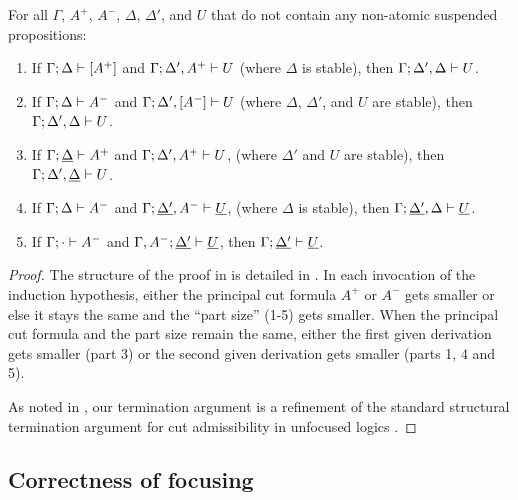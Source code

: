 \bigskip
\begin{theorem}\label{thm:lincut}
For all $\Gamma$, $A^+$, $A^-$, $\Delta$, $\Delta'$, and $U$ that
do not contain any non-atomic suspended propositions:
\begin{enumerate}
\item If ${\Gamma};{\Delta} \vdash {[A^+]} \mathstrut$
      and ${\Gamma};{\Delta',A^+} \vdash {U} \mathstrut$
      (where $\Delta$ is stable), 
      then ${\Gamma};{\Delta',\Delta} \vdash {U} \mathstrut$.
\item If ${\Gamma};{\Delta} \vdash {A^-} \mathstrut$
      and ${\Gamma};{\Delta', [A^-]} \vdash {U} \mathstrut$
      (where $\Delta$, $\Delta'$, and $U$ are stable),
      then ${\Gamma};{\Delta',\Delta} \vdash {U} \mathstrut$. 
\item If ${\Gamma};{\underline{\Delta}} \vdash {A^+} \mathstrut$
      and ${\Gamma};{\Delta', A^+} \vdash {U} \mathstrut$,
      (where $\Delta'$ and $U$ are stable),
      then ${\Gamma};{\Delta',\underline{\Delta}} \vdash {U} \mathstrut$. 
\item If ${\Gamma};{\Delta} \vdash {A^-} \mathstrut$
      and ${\Gamma};{\underline{\Delta'}, A^-} \vdash {\underline{U}} \mathstrut$,
      (where $\Delta$ is stable),
      then ${\Gamma};{\underline{\Delta'},\Delta} \vdash {\underline{U}} \mathstrut$. 
\item If ${\Gamma};{\cdot} \vdash {A^-} \mathstrut$
      and ${\Gamma, A^-};{\underline{\Delta'}} \vdash {\underline{U}} \mathstrut$,
      then ${\Gamma};{\underline{\Delta'}} \vdash {\underline{U}} \mathstrut$. 
\end{enumerate}
\end{theorem}

\begin{proof}
  The structure of the proof in is detailed in
  \cite{simmons12cut}.  In each invocation of the induction
  hypothesis, either the principal cut formula $A^+$ or $A^-$ gets
  smaller or else it stays the same and the ``part size'' (1-5) gets
  smaller. When the principal cut formula and the part size remain the
  same, either the first given derivation gets smaller (part 3)
  or the second given derivation gets smaller (parts 1, 4 and 5).

  As noted in \cite{simmons11structural},
  our termination argument is a refinement of 
  the standard structural termination argument for cut admissibility
  in unfocused logics \cite{pfenning00structural}.
\end{proof}

\subsection{Correctness of focusing}
\label{sec:lincorrectness}

